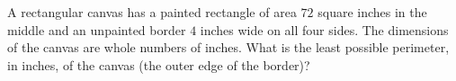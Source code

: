 A rectangular canvas has a painted rectangle of area $72$ square inches in the middle and an unpainted border $4$ inches wide on all four sides. The dimensions of the canvas are whole numbers of inches. What is the least possible perimeter, in inches, of the canvas (the outer edge of the border)?
